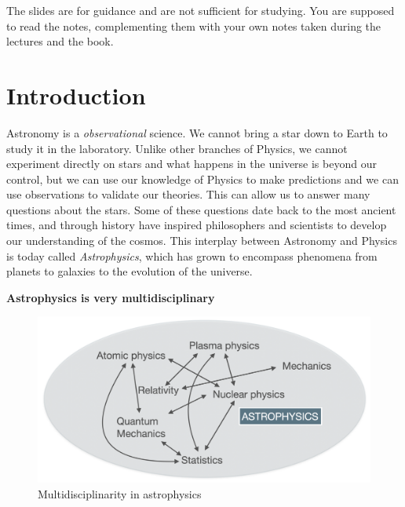 \documentclass[
  letterpaper,
  DIV=11,
  numbers=noendperiod]{scrreprt}
\begin{document}
The slides are for guidance and are not sufficient for studying. You are
supposed to read the notes, complementing them with your own notes taken
during the lectures and the book.


\hypertarget{introduction-1}{%
\chapter*{Introduction}\label{introduction-1}}


Astronomy is a \emph{observational} science. We cannot bring a star down
to Earth to study it in the laboratory. Unlike other branches of
Physics, we cannot experiment directly on stars and what happens in the
universe is beyond our control, but we can use our knowledge of Physics
to make predictions and we can use observations to validate our
theories. This can allow us to answer many questions about the stars.
Some of these questions date back to the most ancient times, and through
history have inspired philosophers and scientists to develop our
understanding of the cosmos. This interplay between Astronomy and
Physics is today called \emph{Astrophysics}, which has grown to
encompass phenomena from planets to galaxies to the evolution of the
universe.

\textbf{Astrophysics is very multidisciplinary}

\begin{figure}

{\centering \includegraphics{img/astrophysics_multidisciplinary.png}

}

\caption{Multidisciplinarity in astrophysics}

\end{figure}
\end{document}
